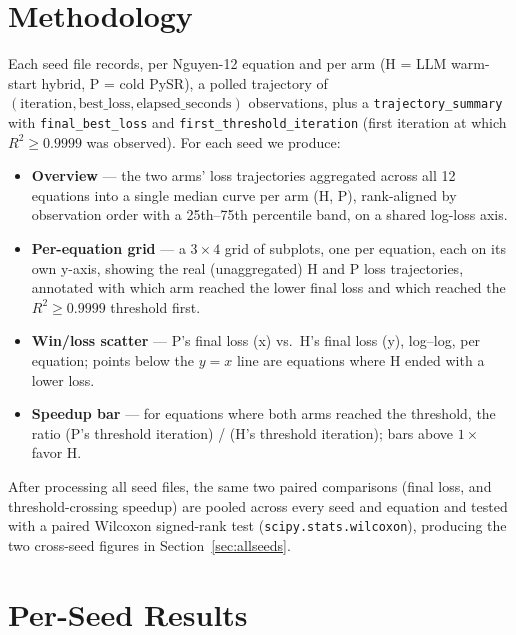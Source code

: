 \documentclass[11pt]{article}
\newcommand{\Rsq}{R^2}
\begin{document}
\tableofcontents

\section{Methodology}
\label{sec:methodology}

Each seed file records, per Nguyen-12 equation and per arm (H = LLM warm-start hybrid, P = cold
PySR), a polled trajectory of $(\text{iteration}, \text{best\_loss}, \text{elapsed\_seconds})$
observations, plus a \texttt{trajectory\_summary} with \texttt{final\_best\_loss} and
\texttt{first\_threshold\_iteration} (first iteration at which $\Rsq \ge 0.9999$ was observed).
For each seed we produce:

\begin{itemize}
  \item \textbf{Overview} --- the two arms' loss trajectories aggregated across all 12 equations
    into a single median curve per arm (H, P), rank-aligned by observation order with a 25th--75th
    percentile band, on a shared log-loss axis.
  \item \textbf{Per-equation grid} --- a $3\times4$ grid of subplots, one per equation, each on its
    own y-axis, showing the real (unaggregated) H and P loss trajectories, annotated with which arm
    reached the lower final loss and which reached the $\Rsq\ge0.9999$ threshold first.
  \item \textbf{Win/loss scatter} --- P's final loss (x) vs.\ H's final loss (y), log--log, per
    equation; points below the $y=x$ line are equations where H ended with a lower loss.
  \item \textbf{Speedup bar} --- for equations where both arms reached the threshold, the ratio
    (P's threshold iteration) / (H's threshold iteration); bars above $1\times$ favor H.
\end{itemize}

\noindent After processing all seed files, the same two paired comparisons (final loss, and
threshold-crossing speedup) are pooled across every seed and equation and tested with a paired
Wilcoxon signed-rank test (\texttt{scipy.stats.wilcoxon}), producing the two cross-seed figures in
Section~\ref{sec:allseeds}.

\section{Per-Seed Results}
\label{sec:perseed}

\FloatBarrier
\end{document}
